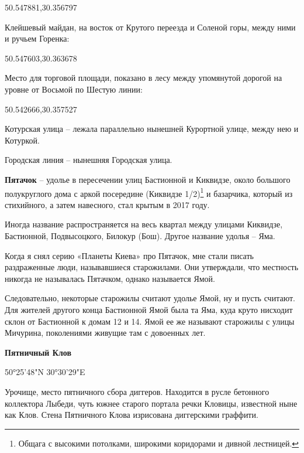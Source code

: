 50.547881,30.356797

Клейшевый майдан, на восток от Крутого переезда и Соленой горы, между ними и ручьем Горенка:

50.547603,30.363678

Место для торговой площади, показано в лесу между упомянутой дорогой на уровне от Восьмой по Шестую линии:

50.542666,30.357527

Котурская улица – лежала параллельно нынешней Курортной улице, между нею и Котуркой.

Городская линия – нынешняя Городская улица.\\

\medskip


\textbf{Пятачок} – удолье в пересечении улиц Бастионной и Киквидзе, около большого полукруглого дома с аркой посередине (Киквидзе 1/2)\footnote{Общага с высокими потолками,  широкими коридорами и дивной лестницей.} и базарчика, который из стихийного, а затем навесного, стал крытым в 2017 году.

Иногда название распространяется на весь квартал между улицами Киквидзе, Бастионной, Подвысоцкого, Билокур (Бош). Другое название удолья – Яма.

Когда я снял серию «Планеты Киева» про Пятачок, мне стали писать раздраженные люди, называвшиеся старожилами. Они утверждали, что местность никогда не называлась Пятачком, однако называется Ямой. 

Следовательно, некоторые старожилы считают удолье Ямой, ну и пусть считают. Для жителей другого конца Бастионной Ямой была та Яма, куда круто нисходит склон от Бастионной к домам 12 и 14. Ямой ее же называют старожилы с улицы Мичурина, поколениями живущие там с довоенных лет.\\

\medskip

\textbf{Пятничный Клов}

50°25'48"N 30°30'29"E

Урочище, место пятничного сбора диггеров. Находится в русле бетонного коллектора Лыбеди, чуть южнее старого портала речки Кловицы, известной ныне как Клов. Стена Пятничного Клова изрисована диггерскими граффити.
